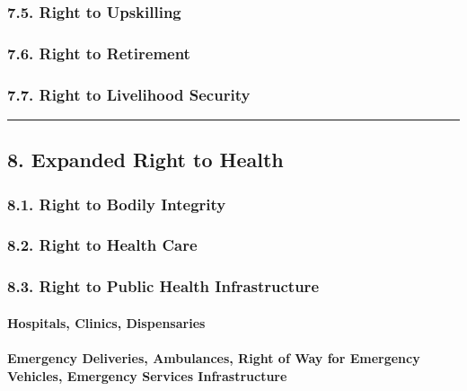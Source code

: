 \subsubsection{7.5. Right to Upskilling}\label{right-to-upskilling}

\subsubsection{7.6. Right to Retirement}\label{right-to-retirement}

\subsubsection{7.7. Right to Livelihood
Security}\label{right-to-livelihood-security}

\begin{center}\rule{0.5\linewidth}{0.5pt}\end{center}

\subsection{8. Expanded Right to Health}\label{expanded-right-to-health}

\subsubsection{8.1. Right to Bodily
Integrity}\label{right-to-bodily-integrity}

\subsubsection{8.2. Right to Health Care}\label{right-to-health-care}

\subsubsection{8.3. Right to Public Health
Infrastructure}\label{right-to-public-health-infrastructure}

\paragraph{Hospitals, Clinics,
Dispensaries}\label{hospitals-clinics-dispensaries}

\paragraph{Emergency Deliveries, Ambulances, Right of Way for Emergency
Vehicles, Emergency Services
Infrastructure}\label{emergency-deliveries-ambulances-right-of-way-for-emergency-vehicles-emergency-services-infrastructure}

